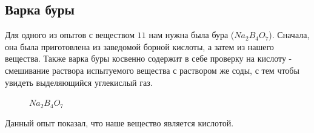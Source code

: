 \documentclass[a4paper,14pt,notitlepage,twoside]{article}
\begin{document}
        \subsection{Варка буры}
            Для одного из опытов с веществом $11$ нам нужна была бура ($Na_2B_4O_7$). 
            Сначала, она была приготовлена из заведомой борной кислоты, а затем из
            нашего вещества. Также варка буры косвенно содержит в себе проверку на кислоту - 
            смешивание раствора испытуемого вещества с раствором же соды, с тем чтобы увидеть 
            выделяющийся углекислый газ.\\

            \begin{figure}[h]
                \caption{$Na_2B_4O_7$}
            \end{figure}

            Данный опыт показал, что наше вещество является кислотой.
\end{document}
